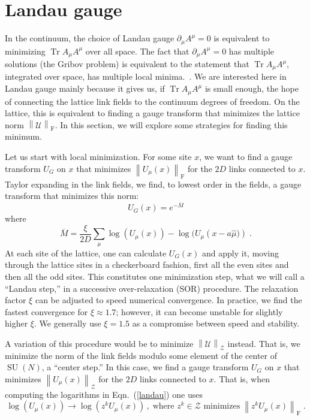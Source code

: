 \documentclass[preprint,aps,prd]{revtex4-2}
\newcommand{\be}{\begin{equation}}
\newcommand{\eq}{\end{equation}}
\newcommand{\zentrum}{\mathcal{Z}}       %
\newcommand{\config}{\mathcal{U}}
\newcommand{\orelax}{\xi}
\DeclareMathOperator{\SU}{SU}
\DeclareMathOperator{\Tr}{Tr}
\newcommand\fnorm[1]{\left\lVert #1 \right\rVert_\mathrm{F}}
\newcommand\znorm[1]{\left\lVert #1 \right\rVert_\zentrum}
\begin{document}
\section{Landau gauge}

In the continuum, the choice of Landau gauge $\partial_\mu A^\mu = 0$
is equivalent to minimizing $\Tr A_\mu A^\mu$ over all space.  The fact that
$\partial_\mu A^\mu = 0$ has multiple solutions (the Gribov problem) is
equivalent to the statement that $\Tr A_\mu A^\mu$, integrated over space,
has multiple local minima.~\cite{maas_more_2009}.
We are interested here in Landau gauge mainly
because it gives us, if $\Tr A_\mu A^\mu$ is small enough, the
hope of connecting the lattice
link fields to the continuum degrees of freedom.
On the lattice, this is equivalent to finding a gauge transform
that minimizes the lattice norm $\fnorm{\config}$.  In this
section, we will explore some strategies for finding this minimum.

Let us start with local minimization.
For some site $x$, we want to find a gauge transform $U_G$ on $x$
that minimizes $\fnorm{U_\mu(x)}$ for the $2D$
links connected to $x$.  Taylor expanding in the link fields,
we find, to lowest order in the fields, a gauge transform
that minimizes this norm:
%
\be
          U_G(x) = e^{- \overline{M}}
\eq
where
\be
   \overline{M} = \frac{\orelax}{2 D} \sum_\mu \log\left(U_\mu(x)\right) -
   \log(U_\mu\left(x-a \hat{\mu})\right)  \; . \label{landau}
\eq
At each site of the lattice, one can calculate $U_G(x)$ and apply it,
moving through the lattice sites in a checkerboard fashion,
first all the even sites and then all the odd sites.
This constitutes one minimization step, what we will call
a ``Landau step,'' in a
successive over-relaxation (SOR) procedure.
The relaxation factor $\orelax$ can be adjusted to speed numerical
convergence.
In practice, we find the fastest convergence for $\orelax \approx 1.7$;
however, it can become unstable for slightly higher $\orelax$.
We generally use $\orelax=1.5$ as a compromise between speed and stability.

A variation of this procedure would be to minimize
$\znorm{\config}$ instead.
That is, we minimize the norm of the link
fields modulo some element of the center of $\SU(N)$, a ``center step.''
In this case, we find a gauge transform $U_G$ on $x$
that minimizes $\znorm{U_\mu(x)}$ for the $2D$
links connected to $x$.
That is, when computing the logarithms in Eqn.~(\ref{landau}) one uses
\be
\log\left(U_\mu(x)\right) \to \log\left(z^k U_\mu(x)\right)
\, , \;\mbox{
  where $z^k\in\zentrum$ minimizes}\; \fnorm{z^k U_\mu(x)} \;.
\eq
\end{document}
